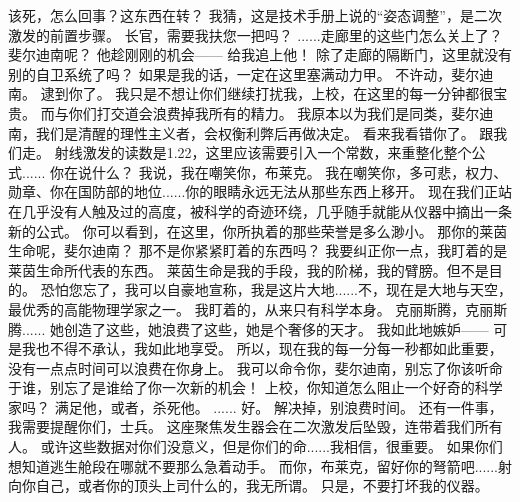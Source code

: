 \documentclass[openany]{book}
\begin{document}
\begin{dialogue}
     该死，怎么回事？这东西在转？
     我猜，这是技术手册上说的“姿态调整”，是二次激发的前置步骤。
     长官，需要我扶您一把吗？
     ......走廊里的这些门怎么关上了？斐尔迪南呢？
     他趁刚刚的机会——
     给我追上他！
     除了走廊的隔断门，这里就没有别的自卫系统了吗？
     如果是我的话，一定在这里塞满动力甲。
     不许动，斐尔迪南。
     逮到你了。
     我只是不想让你们继续打扰我，上校，在这里的每一分钟都很宝贵。
     而与你们打交道会浪费掉我所有的精力。
     我原本以为我们是同类，斐尔迪南，我们是清醒的理性主义者，会权衡利弊后再做决定。
     看来我看错你了。
     跟我们走。
     射线激发的读数是1.22，这里应该需要引入一个常数，来重整化整个公式......
     你在说什么？
     我说，我在嘲笑你，布莱克。
     我在嘲笑你，多可悲，权力、勋章、你在国防部的地位......你的眼睛永远无法从那些东西上移开。
     现在我们正站在几乎没有人触及过的高度，被科学的奇迹环绕，几乎随手就能从仪器中摘出一条新的公式。
     你可以看到，在这里，你所执着的那些荣誉是多么渺小。
     那你的莱茵生命呢，斐尔迪南？
     那不是你紧紧盯着的东西吗？
     我要纠正你一点，我盯着的是莱茵生命所代表的东西。
     莱茵生命是我的手段，我的阶梯，我的臂膀。但不是目的。
     恐怕您忘了，我可以自豪地宣称，我是这片大地......不，现在是大地与天空，最优秀的高能物理学家之一。
     我盯着的，从来只有科学本身。
     克丽斯腾，克丽斯腾......
     她创造了这些，她浪费了这些，她是个奢侈的天才。
     我如此地嫉妒——
     可是我也不得不承认，我如此地享受。
     所以，现在我的每一分每一秒都如此重要，没有一点点时间可以浪费在你身上。
     我可以命令你，斐尔迪南，别忘了你该听命于谁，别忘了是谁给了你一次新的机会！
     上校，你知道怎么阻止一个好奇的科学家吗？
     满足他，或者，杀死他。
     ......
     好。
     解决掉，别浪费时间。
     还有一件事，我需要提醒你们，士兵。
     这座聚焦发生器会在二次激发后坠毁，连带着我们所有人。
     或许这些数据对你们没意义，但是你们的命......我相信，很重要。
     如果你们想知道逃生舱段在哪就不要那么急着动手。
     而你，布莱克，留好你的弩箭吧......射向你自己，或者你的顶头上司什么的，我无所谓。
     只是，不要打坏我的仪器。
\end{dialogue}
\end{document}
